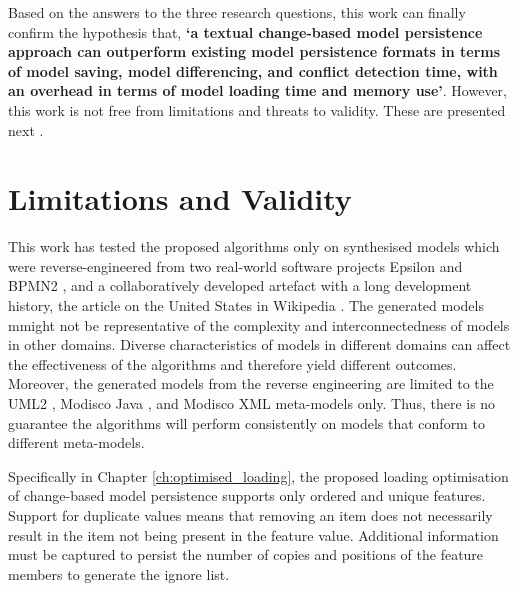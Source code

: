 Based on the answers to the three research questions, this work can finally confirm the hypothesis that,
\textbf{‘a textual change-based model persistence approach can outperform existing model persistence formats in terms of model saving, model differencing, and conflict detection time, with an overhead in terms of model loading time and memory use’}. However, this work is not free from limitations and threats to validity. These are presented next .

\section{Limitations and Validity}
\label{sec:limitation_and_Threat_to_validity}
This work has tested the proposed algorithms only on synthesised models which were reverse-engineered from two real-world software projects Epsilon \cite{eclipse2018epsilongit} and BPMN2 \cite{eclipse2018bpmn2git}, and a collaboratively developed artefact with a long development history, the article on the United States in Wikipedia \cite{wikipedia2018us}. The generated models mmight not be representative of the complexity and interconnectedness of models in other domains. Diverse characteristics of models in different domains can affect the effectiveness of the algorithms and therefore yield different outcomes. Moreover, the generated models from the reverse engineering are limited to the UML2 \cite{eclipse2017uml2}, Modisco Java \cite{eclipse2018modiscojava}, and Modisco XML \cite{eclipse2018modiscoxml} meta-models only. Thus, there is no guarantee the algorithms will perform consistently on models that conform to different meta-models.

Specifically in Chapter \ref{ch:optimised_loading}, the proposed loading optimisation of change-based model persistence supports only ordered and unique features. Support for duplicate values means that removing an item does not necessarily result in the item not being present in the feature value. Additional information must be captured to persist the number of copies and positions of the feature members to generate the ignore list.

